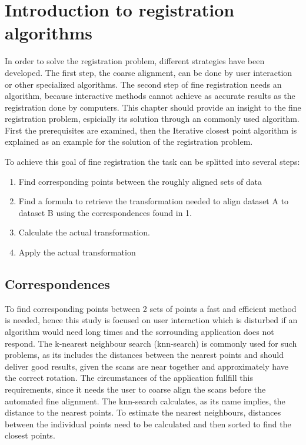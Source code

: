\documentclass[hyperref,english,bachelorofscience,bibnum]{cgvpub}
\begin{document}
\section{Introduction to registration algorithms}

In order to solve the registration problem, different strategies have been developed. The first step, the coarse alignment, can be done by user interaction or other specialized algorithms. The second step of fine registration needs an algorithm, because interactive methods cannot achieve as accurate results as the registration done by computers. This chapter should provide an insight to the fine registration problem, espicially its solution through an commonly used algorithm. First the prerequisites are examined, then the Iterative closest point algorithm is explained as an example for the solution of the registration problem.

To achieve this goal of fine registration the task can be splitted into several steps:
\begin{enumerate}
\item  Find corresponding points between the roughly aligned sets of data
\item  Find a formula to retrieve the transformation needed to align dataset A to dataset B using the correspondences found in 1.
\item Calculate the actual transformation.
\item Apply the actual transformation
\end{enumerate}

\subsection{Correspondences}

To find corresponding points between 2 sets of points a fast and efficient method is needed, hence this study is focused on user interaction which is disturbed if an algorithm would need long times and the sorrounding application does not respond.
The k-nearest neighbour search (knn-search) is commonly used for such problems, as its includes the distances between the nearest points and should deliver good results, given the scans are near together and approximately have the correct rotation. The circumstances of the application fullfill this requirements, since it needs the user to coarse align the scans before the automated fine alignment.
The knn-search calculates, as its name implies, the distance to the nearest points. To estimate the nearest neighbours, distances between the individual points need to be calculated and then sorted to find the closest points.
\end{document}
